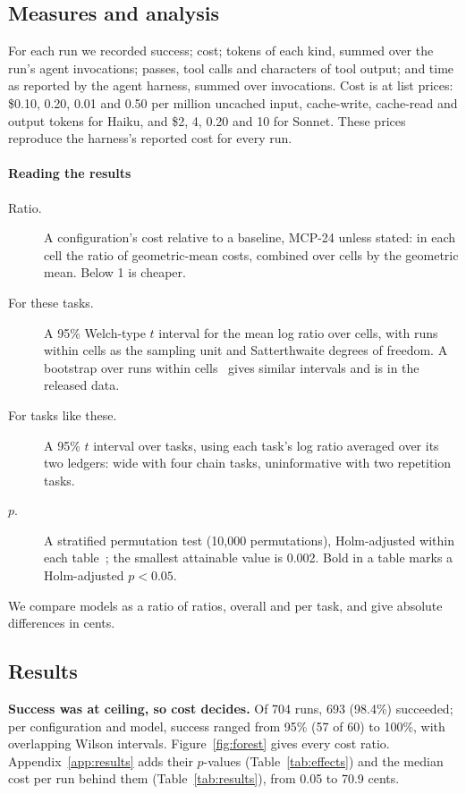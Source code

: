 \documentclass[sigconf,nonacm]{acmart}
\newcommand{\cfg}[1]{\textsf{#1}}
\newcommand{\finding}[1]{\textbf{#1}}
\begin{document}
\subsection{Measures and analysis}
\label{sec:analysis}
For each run we recorded success; cost; tokens of each kind, summed over the run's agent invocations; passes, tool calls and characters of tool output; and time as reported by the agent harness, summed over invocations. Cost is at list prices: \$0.10, 0.20, 0.01 and 0.50 per million uncached input, cache-write, cache-read and output tokens for Haiku, and \$2, 4, 0.20 and 10 for Sonnet. These prices reproduce the harness's reported cost for every run.

\paragraph{Reading the results}
\begin{description}
\item[Ratio.] A configuration's cost relative to a baseline, \cfg{MCP-24} unless stated: in each cell the ratio of geometric-mean costs, combined over cells by the geometric mean. Below 1 is cheaper.
\item[For these tasks.] A 95\% Welch-type $t$ interval for the mean log ratio over cells, with runs within cells as the sampling unit and Satterthwaite degrees of freedom. A bootstrap over runs within cells~\cite{efron1994bootstrap} gives similar intervals and is in the released data.
\item[For tasks like these.] A 95\% $t$ interval over tasks, using each task's log ratio averaged over its two ledgers: wide with four chain tasks, uninformative with two repetition tasks.
\item[$p$.] A stratified permutation test (10{,}000 permutations), Holm-adjusted within each table~\cite{holm1979}; the smallest attainable value is 0.002. Bold in a table marks a Holm-adjusted $p < 0.05$.
\end{description}
We compare models as a ratio of ratios, overall and per task, and give absolute differences in cents.

\subsection{Results}
\label{sec:results}

\finding{Success was at ceiling, so cost decides.} Of 704 runs, 693 (98.4\%) succeeded; per configuration and model, success ranged from 95\% (57 of 60) to 100\%, with overlapping Wilson intervals. Figure~\ref{fig:forest} gives every cost ratio. Appendix~\ref{app:results} adds their $p$-values (Table~\ref{tab:effects}) and the median cost per run behind them (Table~\ref{tab:results}), from 0.05 to 70.9 cents.
\end{document}
